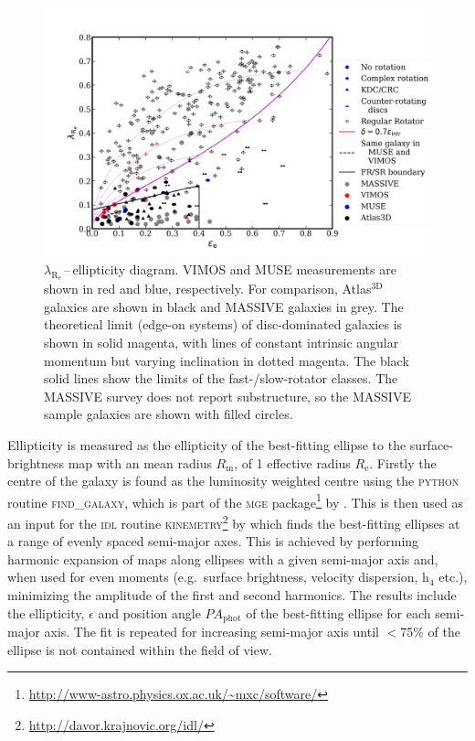 		\begin{figure}
			\centering
			\includegraphics[width=.9\textwidth]{chapter4/lambda_R_ellipticity.png}
			\caption[$\lambda_\mathrm{R_e}$\,--\,ellipticity diagram]{$\lambda_\mathrm{R_e}$\,--\,ellipticity diagram. VIMOS and MUSE measurements are shown in red and blue, respectively. For comparison, Atlas$^\text{3D}$ galaxies \citep{Emsellem2011} are shown in black and MASSIVE galaxies \citep{Veale2017} in grey. The theoretical limit (edge-on systems) of disc-dominated galaxies is shown in solid magenta, with lines of constant intrinsic angular momentum but varying inclination in dotted magenta. The black solid lines show the limits of the fast-/slow-rotator classes. The MASSIVE survey does not report substructure, so the MASSIVE sample galaxies are shown with filled circles.}
			\label{fig:lambdaR_ellip}
		\end{figure}

		Ellipticity is measured as the ellipticity of the best-fitting ellipse to the surface-brightness map with an mean radius $R_\mathrm{m}$, of 1 effective radius $R_\mathrm{e}$. Firstly the centre of the galaxy is found as the luminosity weighted centre using the \textsc{python} routine \textsc{find\_galaxy}, which is part of the \textsc{mge} package\footnote{\url{http://www-astro.physics.ox.ac.uk/\~mxc/software/}} by \citet{Cappellari2002}. This is then used as an input for the \textsc{idl} routine \textsc{kinemetry}\footnote{\url{http://davor.krajnovic.org/idl/}} by \citet{Krajnovic2006} which finds the best-fitting ellipses at a range of evenly spaced semi-major axes. This is achieved by performing harmonic expansion of maps along ellipses with a given semi-major axis and, when used for even moments (e.g.\ surface brightness, velocity dispersion, h$_4$ etc.), minimizing the amplitude of the first and second harmonics. The results include the ellipticity, $\epsilon$ and position angle $PA_\text{phot}$ of the best-fitting ellipse for each semi-major axis. The fit is repeated for increasing semi-major axis until $<$75\% of the ellipse is not contained within the field of view.

